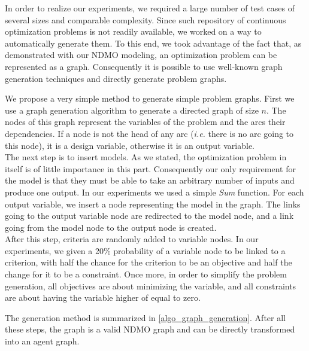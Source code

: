 In order to realize our experiments, we required a large number of test cases of several sizes and comparable complexity. Since such repository of continuous optimization problems is not readily available, we worked on a way to automatically generate them. To this end, we took advantage of the fact that, as demonstrated with our NDMO modeling, an optimization problem can be represented as a graph. Consequently it is possible to use well-known graph generation techniques and directly generate problem graphs.

We propose a very simple method to generate simple problem graphs. First we use a graph generation algorithm to generate a directed graph of size $n$. The nodes of this graph represent the variables of the problem and the arcs their dependencies. If a node is not the head of any arc (\emph{i.e.} there is no arc going to this node), it is a design variable, otherwise it is an output variable.\\
The next step is to insert models. As we stated, the optimization problem in itself is of little importance in this part. Consequently our only requirement for the model is that they must be able to take an arbitrary number of inputs and produce one output. In our experiments we used a simple \emph{Sum} function. For each output variable, we insert a node representing the model in the graph. The links going to the output variable node are redirected to the model node, and a link going from the model node to the output node is created.\\
After this step, criteria are randomly added to variable nodes. In our experiments, we given a 20\% probability of a variable node to be linked to a criterion, with half the chance for the criterion to be an objective and half the change for it to be a constraint. Once more, in order to simplify the problem generation, all objectives are about minimizing the variable, and all constraints are about having the variable higher of equal to zero.

The generation method is summarized in \ref{algo_graph_generation}. After all these steps, the graph is a valid NDMO graph and can be directly transformed into an agent graph.

